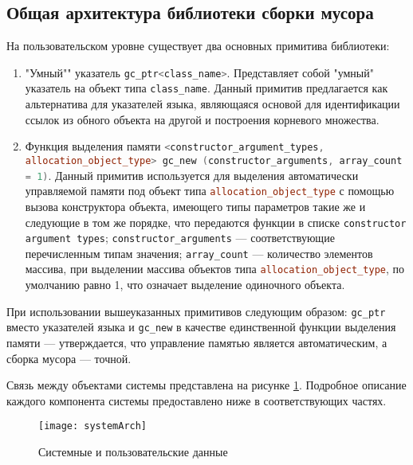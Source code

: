\subsection{Общая архитектура библиотеки сборки мусора}
На пользовательском уровне существует два основных примитива библиотеки:
\begin{enumerate}
\item "Умный"" указатель \lstinline[language= cpp]{gc_ptr<class_name>}. Представляет собой "умный" указатель на объект типа
	\lstinline[language= cpp]{class_name}.
	Данный примитив предлагается как альтернатива для указателей языка, являющаяся основой для идентификации ссылок из
	обного объекта на другой и построения корневого множества.
\item Функция выделения памяти \sloppy\lstinline[language= cpp]{<constructor_argument_types, allocation_object_type> gc_new (constructor_arguments, array_count = 1)}. Данный примитив используется для выделения автоматически управляемой памяти под объект типа \lstinline[language= cpp]{allocation_object_type} с помощью вызова конструктора объекта, имеющего типы параметров такие же и следующие в том же порядке, что передаются функции в списке \lstinline[language= cpp]{constructor argument types};
	\lstinline[language= cpp]{constructor_arguments} --- соответствующие перечисленным типам значения;
	\lstinline[language= cpp]{array_count} --- количество элементов массива, при выделении массива объектов типа
	\lstinline[language= cpp]{allocation_object_type}, по умолчанию равно 1, что означает выделение одиночного объекта.
\end{enumerate}
При использовании вышеуказанных примитивов следующим образом: \lstinline[language= cpp]{gc_ptr} вместо указателей языка и
\lstinline[language= cpp]{gc_new} в качестве единственной функции выделения памяти --- утверждается,
что управление памятью является автоматическим, а сборка мусора --- точной.

Связь между объектами системы представлена на рисунке \ref{fig:systemArch}. Подробное описание каждого компонента системы предоставлено
ниже в соответствующих частях.
\begin{figure}[h!]
	\centering
	\texttt{[image: systemArch]}
	\caption{Системные и пользовательские данные}
	\label{fig:systemArch}
\end{figure}

